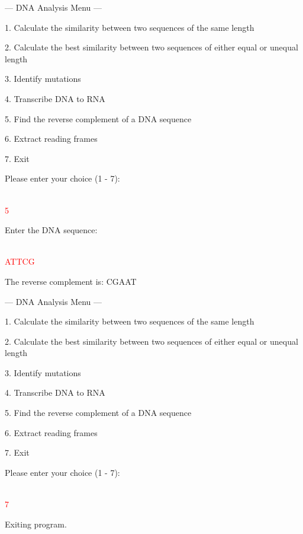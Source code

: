 \begin{sample}

    --- DNA Analysis Menu ---
    
    1. Calculate the similarity between two sequences of the same length
    
    2. Calculate the best similarity between two sequences of either equal or unequal length
    
    3. Identify mutations
    
    4. Transcribe DNA to RNA
    
    5. Find the reverse complement of a DNA sequence
    
    6. Extract reading frames
    
    7. Exit
    
    Please enter your choice (1 - 7): 
    
    \\\textcolor{red}{5}

    Enter the DNA sequence:

    \\\textcolor{red}{ATTCG}

    The reverse complement is: CGAAT
    
    --- DNA Analysis Menu ---
    
    1. Calculate the similarity between two sequences of the same length
   
    2. Calculate the best similarity between two sequences of either equal or unequal length
    
    3. Identify mutations
    
    4. Transcribe DNA to RNA
    
    5. Find the reverse complement of a DNA sequence
    
    6. Extract reading frames
    
    7. Exit
    
    Please enter your choice (1 - 7): 
    
    \\\textcolor{red}{7}
    
    Exiting program.
\end{sample}


